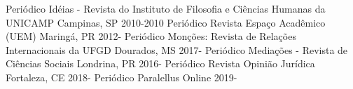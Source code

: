 \begin{cvhonors}
  \cvhonor
    {Periódico}
    {Idéias - Revista do Instituto de Filosofia e Ciências Humanas da UNICAMP}
    {Campinas, SP}
    {2010-2010}
  \cvhonor
    {Periódico}
    {Revista Espaço Acadêmico (UEM)}
    {Maringá, PR}
    {2012-}
  \cvhonor
    {Periódico}
    {Monções: Revista de Relações Internacionais da UFGD}
    {Dourados, MS}
    {2017-}
  \cvhonor
    {Periódico}
    {Mediações - Revista de Ciências Sociais}
    {Londrina, PR}
    {2016-}
  \cvhonor
    {Periódico}
    {Revista Opinião Jurídica}
    {Fortaleza, CE}
    {2018-}
  \cvhonor
    {Periódico}
    {Paralellus}
    {Online}
    {2019-}
\end{cvhonors}

